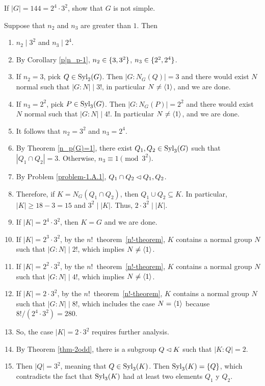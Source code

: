 \begin{probl}
    If\/ $|G|=144=2^4\cdot3^2$, show that\/ $G$ is not simple.
\end{probl}

\begin{solution} Suppose that $n_2$ and $n_3$ are greater than $1$. Then
\begin{enumerate}[\rm1.]
    \item $n_2\mid3^2$ and $n_3\mid2^4$.
    \item By Corollary \ref{p|n_p-1}, $n_2\in\{3,3^2\}$, $n_3\in\{2^2, 2^4\}$.
    \item If $n_2=3$, pick $Q\in{\rm Syl}_2(G)$. Then $|G:N_G(Q)|=3$ and there would exist $N$ normal such that $|G:N|\mid3!$, in particular $N\ne\langle1\rangle$, and we are done.
    \item If $n_3=2^2$, pick $P\in{\rm Syl}_3(G)$. Then $|G:N_G(P)|=2^2$ and there would exist $N$ normal such that $|G:N|\mid 4!$. In particular $N\ne\langle1\rangle$, and we are done.
    \item It follows that $n_2=3^2$ and $n_3=2^4$.
    \item By Theorem \ref{n_p(G)=1}, there exist $Q_1,Q_2\in{\rm Syl}_3(G)$ such that $|Q_1\cap Q_2|=3$. Otherwise, $n_3\equiv1\pmod{3^2}$.
    \item By Problem \ref{problem-1.A.1}, $Q_1\cap Q_2\lhd Q_1, Q_2$.
    \item Therefore, if $K=N_G(Q_1\cap Q_2)$, then $Q_1\cup Q_2\subseteq K$. In particular, $|K|\ge 18-3=15$ and $3^2\mid|K|$. Thus, $2\cdot3^2\mid|K|$.
    \item If $|K|=2^4\cdot3^2$, then $K=G$ and we are done.
    \item If $|K|=2^3\cdot3^2$, by the $n!$~theorem~\ref{n!-theorem}, $K$ contains a normal group $N$ such that $|G:N|\mid2!$, which implies $N\ne\langle1\rangle$.
    \item If $|K|=2^2\cdot3^2$, by the $n!$~theorem~\ref{n!-theorem}, $K$ contains a normal group $N$ such that $|G:N|\mid4!$, which implies $N\ne\langle1\rangle$.
    \item If $|K|=2\cdot3^2$, by the $n!$~theorem~\ref{n!-theorem}, $K$ contains a normal group $N$ such that $|G:N|\mid8!$, which includes the case $N=\langle1\rangle$ because $8!/(2^4\cdot3^2)=280$.
    \item So, the case $|K|=2\cdot3^2$ requires further analysis.
    \item By Theorem \ref{thm-2odd}, there is a subgroup $Q\lhd K$ such that $|K:Q|=2$.
    \item Then $|Q|=3^2$, meaning that $Q\in{\rm Syl}_3(K)$. Then ${\rm Syl}_3(K)=\{Q\}$, which contradicts the fact that ${\rm Syl}_3(K)$ had at least two elements $Q_1$ y $Q_2$.
\end{enumerate}
\end{solution}

